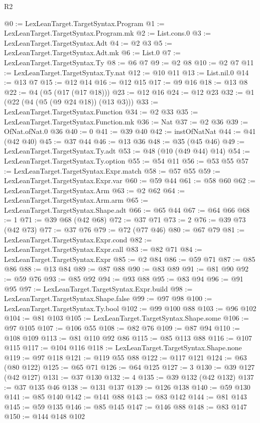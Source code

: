 \begin{lexlean}{R2}
\begin{coremodule}
@0 := LexLeanTarget.TargetSyntax.Program
@1 := LexLeanTarget.TargetSyntax.Program.mk
@2 := List.cons.{0}
@3 := LexLeanTarget.TargetSyntax.Adt
@4 := @2 @3
@5 := LexLeanTarget.TargetSyntax.Adt.mk
@6 := List.{0}
@7 := LexLeanTarget.TargetSyntax.Ty
@8 := @6 @7
@9 := @2 @8
@10 := @2 @7
@11 := LexLeanTarget.TargetSyntax.Ty.nat
@12 := @10 @11
@13 := List.nil.{0}
@14 := @13 @7
@15 := @12 @14
@16 := @12 @15
@17 := @9 @16
@18 := @13 @8
@22 := @4 (@5 (@17 (@17 @18)))
@23 := @12 @16
@24 := @12 @23
@32 := @1 (@22 (@4 (@5 (@9 @24 @18)) (@13 @3)))
@33 := LexLeanTarget.TargetSyntax.Function
@34 := @2 @33
@35 := LexLeanTarget.TargetSyntax.Function.mk
@36 := Nat
@37 := @2 @36
@39 := OfNat.ofNat.{0} @36
@40 := 0
@41 := @39 @40
@42 := instOfNatNat
@44 := @41 (@42 @40)
@45 := @37 @44
@46 := @13 @36
@48 := @35 (@45 @46)
@49 := LexLeanTarget.TargetSyntax.Ty.adt
@53 := @48 (@10 (@49 @44) @14)
@54 := LexLeanTarget.TargetSyntax.Ty.option
@55 := @54 @11
@56 := @53 @55
@57 := LexLeanTarget.TargetSyntax.Expr.match
@58 := @57 @55
@59 := LexLeanTarget.TargetSyntax.Expr.var
@60 := @59 @44
@61 := @58 @60
@62 := LexLeanTarget.TargetSyntax.Arm
@63 := @2 @62
@64 := LexLeanTarget.TargetSyntax.Arm.arm
@65 := LexLeanTarget.TargetSyntax.Shape.adt
@66 := @65 @44
@67 := @64 @66
@68 := 1
@71 := @39 @68 (@42 @68)
@72 := @37 @71
@73 := 2
@76 := @39 @73 (@42 @73)
@77 := @37 @76
@79 := @72 (@77 @46)
@80 := @67 @79
@81 := LexLeanTarget.TargetSyntax.Expr.cond
@82 := LexLeanTarget.TargetSyntax.Expr.call
@83 := @82 @71
@84 := LexLeanTarget.TargetSyntax.Expr
@85 := @2 @84
@86 := @59 @71
@87 := @85 @86
@88 := @13 @84
@89 := @87 @88
@90 := @83 @89
@91 := @81 @90
@92 := @59 @76
@93 := @85 @92
@94 := @93 @88
@95 := @83 @94
@96 := @91 @95
@97 := LexLeanTarget.TargetSyntax.Expr.build
@98 := LexLeanTarget.TargetSyntax.Shape.false
@99 := @97 @98
@100 := LexLeanTarget.TargetSyntax.Ty.bool
@102 := @99 @100 @88
@103 := @96 @102
@104 := @81 @103
@105 := LexLeanTarget.TargetSyntax.Shape.some
@106 := @97 @105
@107 := @106 @55
@108 := @82 @76
@109 := @87 @94
@110 := @108 @109
@113 := @81 @110 @92 @86
@115 := @85 @113 @88
@116 := @107 @115
@117 := @104 @116
@118 := LexLeanTarget.TargetSyntax.Shape.none
@119 := @97 @118
@121 := @119 @55 @88
@122 := @117 @121
@124 := @63 (@80 @122)
@125 := @65 @71
@126 := @64 @125
@127 := 3
@130 := @39 @127 (@42 @127)
@131 := @37 @130
@132 := 4
@135 := @39 @132 (@42 @132)
@137 := @37 @135 @46
@138 := @131 @137
@139 := @126 @138
@140 := @59 @130
@141 := @85 @140
@142 := @141 @88
@143 := @83 @142
@144 := @81 @143
@145 := @59 @135
@146 := @85 @145
@147 := @146 @88
@148 := @83 @147
@150 := @144 @148 @102

\end{coremodule}
\end{lexlean}
